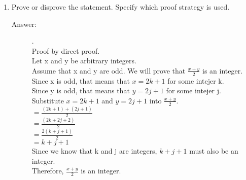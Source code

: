 \documentclass[12pt, oneside]{article}
\begin{document}
\begin{enumerate}
\begin{enumerate}
    \item Prove or disprove the statement. Specify which proof strategy is used.

    \begin{description}
        \item[Answer:] .\\
        Proof by direct proof.\\
        Let x and y be arbitrary integers.\\
        Assume that x and y are odd. We will prove that $\frac{x+y}{2}$ is an integer.\\
        Since x is odd, that means that $x=2k+1$ for some intejer k. \\
        Since y is odd, that means that $y=2j+1$ for some intejer j. \\
        Substitute $x=2k+1$ and $y=2j+1$ into $\frac{x+y}{2}$. \\
        $= \frac{(2k+1)+(2j+1)}{2}$ \\
        $= \frac{(2k+2j+2)}{2}$ \\
        $= \frac{2(k+j+1)}{2}$ \\
        $= k+j+1$ \\
        Since we know that k and j are integers, $k+j+1$ must also be an integer. \\
        Therefore, $\frac{x+y}{2}$ is an integer.
    \end{description}

\end{enumerate}

\quad


\end{enumerate}
\end{document}
